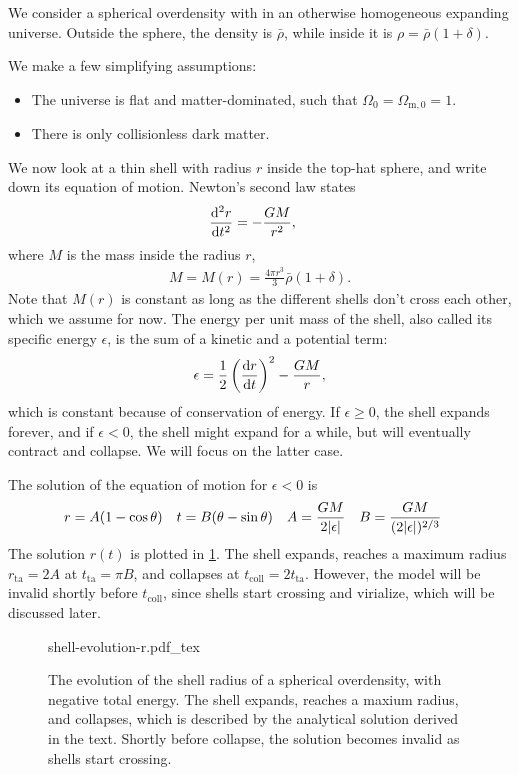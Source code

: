 We consider a spherical overdensity with in an otherwise homogeneous expanding universe. Outside the sphere, the density is $\bar{\rho}$, while inside it is $\rho = \bar{\rho}(1+\delta)$.

We make a few simplifying assumptions:
\begin{itemize}
	\item The universe is flat and matter-dominated, such that $\Omega_0 = \Omega_{\text{m}, 0} = 1$.
	\item There is only collisionless dark matter.
\end{itemize}
We now look at a thin shell with radius $r$ inside the top-hat sphere, and write down its equation of motion. Newton's second law states
\begin{align*}
	\dv[2]{r}{t}
	&= - \frac{G M}{r^2},
\end{align*}
where $M$ is the mass inside the radius $r$,
\begin{align*}
	M = M(r) = \frac{4\pi r^3}{3} \bar{\rho}(1+\delta).
\end{align*}
Note that $M(r)$ is constant as long as the different shells don't cross each other, which we assume for now.
The energy per unit mass of the shell, also called its specific energy $\epsilon$, is the sum of a kinetic and a potential term:
\begin{align*}
	\epsilon = \frac{1}{2} \left( \dv{r}{t} \right)^2
	- \frac{G M}{r},
\end{align*}
which is constant because of conservation of energy.
If $\epsilon \geq 0$, the shell expands forever, and if $\epsilon < 0$, the shell might expand for a while, but will eventually contract and collapse. We will focus on the latter case.

The solution of the equation of motion for $\epsilon < 0$ is
\begin{align*}
	r &= A(1- \cos \theta) &
	t &= B(\theta - \sin\theta) &
	A &= \frac{GM}{2 \vert\epsilon\vert} &
	B &= \frac{GM}{(2 \vert\epsilon\vert)^{2/3}}
\end{align*}
The solution $r(t)$ is plotted in \cref{fig:shell-collapse-r}.
The shell expands, reaches a maximum radius $r_\text{ta} = 2 A$ at $t_\text{ta} = \pi B$, and collapses at $t_\text{coll} = 2 t_\text{ta}$.
However, the model will be invalid shortly before $t_\text{coll}$, since shells start crossing and virialize, which will be discussed later.
\begin{figure}
	\centering
	{shell-evolution-r.pdf_tex}
	\caption{The evolution of the shell radius of a spherical overdensity, with negative total energy. The shell expands, reaches a maxium radius, and collapses, which is described by the analytical solution derived in the text. Shortly before collapse, the solution becomes invalid as shells start crossing.}
	\label{fig:shell-collapse-r}
\end{figure}



